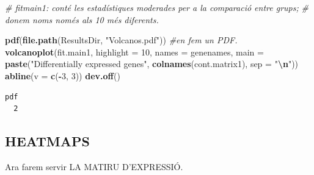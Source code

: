 \documentclass[
]{article}
\newenvironment{Shaded}{\begin{snugshade}}{\end{snugshade}}
\newcommand{\AttributeTok}[1]{\textcolor[rgb]{0.13,0.29,0.53}{#1}}
\newcommand{\CommentTok}[1]{\textcolor[rgb]{0.56,0.35,0.01}{\textit{#1}}}
\newcommand{\DecValTok}[1]{\textcolor[rgb]{0.00,0.00,0.81}{#1}}
\newcommand{\FunctionTok}[1]{\textcolor[rgb]{0.13,0.29,0.53}{\textbf{#1}}}
\newcommand{\NormalTok}[1]{#1}
\newcommand{\SpecialCharTok}[1]{\textcolor[rgb]{0.81,0.36,0.00}{\textbf{#1}}}
\newcommand{\StringTok}[1]{\textcolor[rgb]{0.31,0.60,0.02}{#1}}
\begin{document}
\begin{Shaded}
\begin{Highlighting}[]
\CommentTok{\# fitmain1: conté les estadístiques moderades per a la comparació entre grups;}
\CommentTok{\# donem noms només als 10 més diferents.}

\FunctionTok{pdf}\NormalTok{(}\FunctionTok{file.path}\NormalTok{(ResultsDir, }\StringTok{"Volcanos.pdf"}\NormalTok{))  }\CommentTok{\#en fem un PDF.}
\FunctionTok{volcanoplot}\NormalTok{(fit.main1, }\AttributeTok{highlight =} \DecValTok{10}\NormalTok{, }\AttributeTok{names =}\NormalTok{ genenames, }\AttributeTok{main =} \FunctionTok{paste}\NormalTok{(}\StringTok{"Differentially expressed genes"}\NormalTok{,}
    \FunctionTok{colnames}\NormalTok{(cont.matrix1), }\AttributeTok{sep =} \StringTok{"}\SpecialCharTok{\textbackslash{}n}\StringTok{"}\NormalTok{))}
\FunctionTok{abline}\NormalTok{(}\AttributeTok{v =} \FunctionTok{c}\NormalTok{(}\SpecialCharTok{{-}}\DecValTok{3}\NormalTok{, }\DecValTok{3}\NormalTok{))}
\FunctionTok{dev.off}\NormalTok{()}
\end{Highlighting}
\end{Shaded}

\begin{verbatim}
pdf 
  2 
\end{verbatim}

\subsection{HEATMAPS}\label{heatmaps}

Ara farem servir LA MATIRU D'EXPRESSIÓ.
\end{document}
